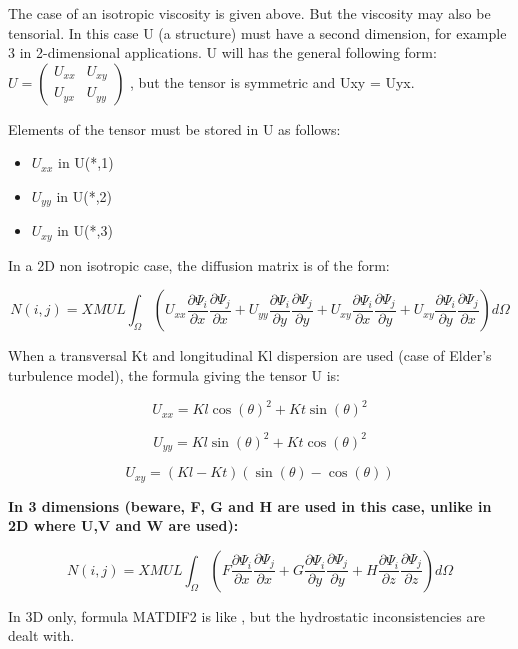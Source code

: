 The case of an isotropic viscosity is given above. But the viscosity may also
be tensorial. In this case U (a structure) must have a second
dimension, for example 3 in 2-dimensional applications. U will has the general
following form:
$U=\left(\begin{array}{cc}
    {U_{xx} } & {U_{xy} } \\
    {U_{yx} } & {U_{yy} }
\end{array}\right)$
, but the tensor is symmetric and Uxy = Uyx.

Elements of the tensor must be stored in U as follows:
\begin{itemize}
  \item $U_{xx}$ in U(*,1)
  \item $U_{yy}$ in U(*,2)
  \item $U_{xy}$ in U(*,3)
\end{itemize}

In a 2D non isotropic case, the diffusion matrix is of the form:

\[
  N(i,j)=XMUL \int _{\Omega }
(U_{xx} \frac{\partial \Psi _{i} }{\partial x}
        \frac{\partial \Psi _{j} }{\partial x}
 +U_{yy} \frac{\partial \Psi _{i} }{\partial y}
         \frac{\partial \Psi _{j} }{\partial y}
 +U_{xy} \frac{\partial \Psi _{i} }{\partial x}
         \frac{\partial \Psi _{j} }{\partial y}
 +U_{xy} \frac{\partial \Psi _{i} }{\partial y}
         \frac{\partial \Psi _{j} }{\partial x} )d\Omega
\]

When a transversal Kt and longitudinal Kl dispersion are used (case of Elder's
turbulence model), the formula giving the tensor U is:

\[U_{xx} =Kl \cos (\theta )^{2} +Kt \sin (\theta )^{2} \]

\[U_{yy} =Kl \sin (\theta )^{2} +Kt \cos (\theta )^{2} \]

\[U_{xy} =(Kl-Kt) (\sin (\theta )- \cos (\theta ))\]

\textbf{In 3 dimensions (beware, F, G and H are used in this case, unlike in 2D
where U,V and W are used):}

\[
  N(i,j)=XMUL
\int _{\Omega }
(F\frac{\partial \Psi _{i} }{\partial x}
  \frac{\partial \Psi _{j} }{\partial x}
+G\frac{\partial \Psi _{i} }{\partial y}
  \frac{\partial \Psi _{j} }{\partial y}
+H\frac{\partial \Psi _{i} }{\partial z}
  \frac{\partial \Psi _{j} }{\partial z} )d\Omega
\]


In 3D only, formula MATDIF2 is like , but the
hydrostatic inconsistencies are dealt with.


